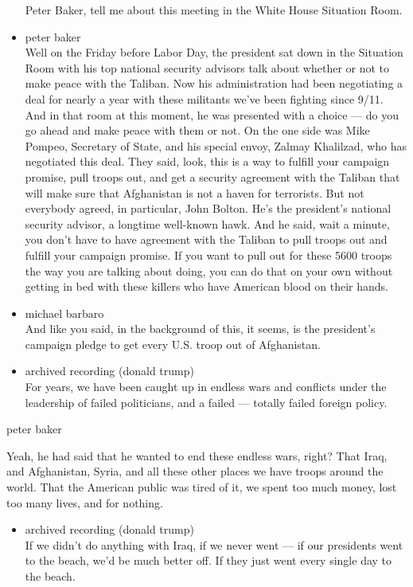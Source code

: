 \begin{itemize}
  Peter Baker, tell me about this meeting in the White House Situation
  Room.
\item
  peter baker\\
  Well on the Friday before Labor Day, the president sat down in the
  Situation Room with his top national security advisors talk about
  whether or not to make peace with the Taliban. Now his administration
  had been negotiating a deal for nearly a year with these militants
  we've been fighting since 9/11. And in that room at this moment, he
  was presented with a choice --- do you go ahead and make peace with
  them or not. On the one side was Mike Pompeo, Secretary of State, and
  his special envoy, Zalmay Khalilzad, who has negotiated this deal.
  They said, look, this is a way to fulfill your campaign promise, pull
  troops out, and get a security agreement with the Taliban that will
  make sure that Afghanistan is not a haven for terrorists. But not
  everybody agreed, in particular, John Bolton. He's the president's
  national security advisor, a longtime well-known hawk. And he said,
  wait a minute, you don't have to have agreement with the Taliban to
  pull troops out and fulfill your campaign promise. If you want to pull
  out for these 5600 troops the way you are talking about doing, you can
  do that on your own without getting in bed with these killers who have
  American blood on their hands.
\item
  michael barbaro\\
  And like you said, in the background of this, it seems, is the
  president's campaign pledge to get every U.S. troop out of
  Afghanistan.
\item
  archived recording (donald trump)\\
  For years, we have been caught up in endless wars and conflicts under
  the leadership of failed politicians, and a failed --- totally failed
  foreign policy.
\end{itemize}

peter baker

Yeah, he had said that he wanted to end these endless wars, right? That
Iraq, and Afghanistan, Syria, and all these other places we have troops
around the world. That the American public was tired of it, we spent too
much money, lost too many lives, and for nothing.

\begin{itemize}
\tightlist
\item
  archived recording (donald trump)\\
  If we didn't do anything with Iraq, if we never went --- if our
  presidents went to the beach, we'd be much better off. If they just
  went every single day to the beach.
\end{itemize}

